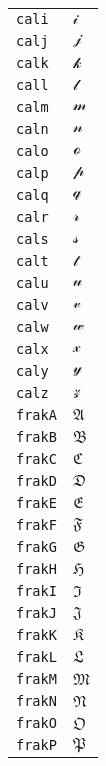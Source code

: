 \begin{longtable}{ll}
\texttt{cali}&${}{\mathcal{i}}{}$\\
\texttt{calj}&${}{\mathcal{j}}{}$\\
\texttt{calk}&${}{\mathcal{k}}{}$\\
\texttt{call}&${}{\mathcal{l}}{}$\\
\texttt{calm}&${}{\mathcal{m}}{}$\\
\texttt{caln}&${}{\mathcal{n}}{}$\\
\texttt{calo}&${}{\mathcal{o}}{}$\\
\texttt{calp}&${}{\mathcal{p}}{}$\\
\texttt{calq}&${}{\mathcal{q}}{}$\\
\texttt{calr}&${}{\mathcal{r}}{}$\\
\texttt{cals}&${}{\mathcal{s}}{}$\\
\texttt{calt}&${}{\mathcal{t}}{}$\\
\texttt{calu}&${}{\mathcal{u}}{}$\\
\texttt{calv}&${}{\mathcal{v}}{}$\\
\texttt{calw}&${}{\mathcal{w}}{}$\\
\texttt{calx}&${}{\mathcal{x}}{}$\\
\texttt{caly}&${}{\mathcal{y}}{}$\\
\texttt{calz}&${}{\mathcal{z}}{}$\\
\texttt{frakA}&${}{\mathfrak{A}} {}$\\
\texttt{frakB}&${}{\mathfrak{B}} {}$\\
\texttt{frakC}&${}{\mathfrak{C}} {}$\\
\texttt{frakD}&${}{\mathfrak{D}} {}$\\
\texttt{frakE}&${}{\mathfrak{E}} {}$\\
\texttt{frakF}&${}{\mathfrak{F}} {}$\\
\texttt{frakG}&${}{\mathfrak{G}} {}$\\
\texttt{frakH}&${}{\mathfrak{H}} {}$\\
\texttt{frakI}&${}{\mathfrak{I}} {}$\\
\texttt{frakJ}&${}{\mathfrak{J}} {}$\\
\texttt{frakK}&${}{\mathfrak{K}} {}$\\
\texttt{frakL}&${}{\mathfrak{L}} {}$\\
\texttt{frakM}&${}{\mathfrak{M}} {}$\\
\texttt{frakN}&${}{\mathfrak{N}} {}$\\
\texttt{frakO}&${}{\mathfrak{O}} {}$\\
\texttt{frakP}&${}{\mathfrak{P}} {}$\\

\end{longtable}
